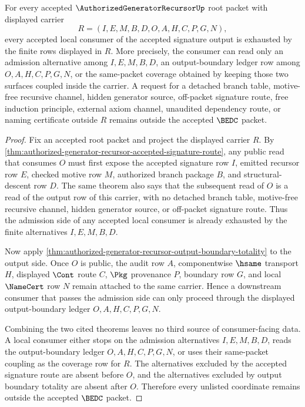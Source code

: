 \begin{lemma}
\label{lem:authorized-generator-recursor-accepted-signature-downstream-coverage}
For every accepted $\AuthorizedGeneratorRecursorUp$ root packet with displayed carrier
$$
R=(I,E,M,B,D,O,A,H,C,P,G,N),
$$
every accepted local consumer of the accepted signature output is exhausted by the finite rows displayed in $R$. More precisely, the consumer can read only an admission alternative among $I,E,M,B,D$, an output-boundary ledger row among $O,A,H,C,P,G,N$, or the same-packet coverage obtained by keeping those two surfaces coupled inside the carrier. A request for a detached branch table, motive-free recursive channel, hidden generator source, off-packet signature route, free induction principle, external axiom channel, unaudited dependency route, or naming certificate outside $R$ remains outside the accepted $\BEDC$ packet.
\end{lemma}
\begin{proof}
Fix an accepted root packet and project the displayed carrier $R$. By \autoref{thm:authorized-generator-recursor-accepted-signature-route}, any public read that consumes $O$ must first expose the accepted signature row $I$, emitted recursor row $E$, checked motive row $M$, authorized branch package $B$, and structural-descent row $D$. The same theorem also says that the subsequent read of $O$ is a read of the output row of this carrier, with no detached branch table, motive-free recursive channel, hidden generator source, or off-packet signature route. Thus the admission side of any accepted local consumer is already exhausted by the finite alternatives $I,E,M,B,D$.

Now apply \autoref{thm:authorized-generator-recursor-output-boundary-totality} to the output side. Once $O$ is public, the audit row $A$, componentwise $\hsame$ transport $H$, displayed $\Cont$ route $C$, $\Pkg$ provenance $P$, boundary row $G$, and local $\NameCert$ row $N$ remain attached to the same carrier. Hence a downstream consumer that passes the admission side can only proceed through the displayed output-boundary ledger $O,A,H,C,P,G,N$.

Combining the two cited theorems leaves no third source of consumer-facing data. A local consumer either stops on the admission alternatives $I,E,M,B,D$, reads the output-boundary ledger $O,A,H,C,P,G,N$, or uses their same-packet coupling as the coverage row for $R$. The alternatives excluded by the accepted signature route are absent before $O$, and the alternatives excluded by output boundary totality are absent after $O$. Therefore every unlisted coordinate remains outside the accepted $\BEDC$ packet.
\end{proof}
